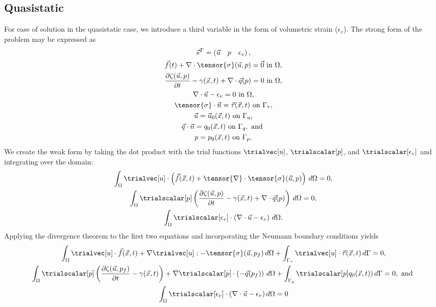 \subsection{Quasistatic}

For ease of solution in the quasistatic case, we introduce a third
variable in the form of volumetric strain ($\epsilon_v$).  The
strong form of the problem may be expressed as
\begin{gather}
\vec{s}^{T} = \left(\vec{u} \quad p \quad \epsilon_v\right), \\
\vec{f}(t) + \nabla \cdot \tensor{\sigma}(\vec{u},p) = \vec{0} \text{ in } \Omega, \\
\frac{\partial \zeta(\vec{u},p)}{\partial t} - \gamma(\vec{x},t) + \nabla \cdot \vec{q}(p) = 0 \text{ in } \Omega, \\
\nabla \cdot \vec{u} - \epsilon_{v} = 0 \text{ in } \Omega, \\
\tensor{\sigma} \cdot \vec{n} = \vec{\tau}(\vec{x},t) \text{ on } \Gamma_{\tau}, \\
\vec{u} = \vec{u}_0(\vec{x}, t) \text{ on } \Gamma_{u}, \\
\vec{q} \cdot \vec{n} = q_0(\vec{x}, t) \text{ on } \Gamma_{q}, \text{ and } \\
p = p_0(\vec{x},t) \text{ on } \Gamma_{p}.
\end{gather}
%
We create the weak form by taking the dot product with the trial
functions $\trialvec[u]$, $\trialscalar[p]$, and
$\trialscalar[\epsilon_{v}]$ and
integrating over the domain:
\begin{gather}
\int_\Omega \trialvec[u] \cdot \left( \vec{f}(\vec{x},t) + \tensor{\nabla} \cdot \tensor{\sigma} (\vec{u},p) \right) \, d\Omega = 0, \\
\int_\Omega  \trialscalar[p] \left( \frac{\partial \zeta(\vec{u},p)}{\partial t} - \gamma(\vec{x},t) + \nabla \cdot \vec{q}(p)\right) \, d\Omega = 0,\\
\int_{\Omega} \trialscalar[\epsilon_{v}]\cdot \left( \nabla \cdot \vec{u} - \epsilon_v \right) \, d\Omega.
\end{gather}
%
Applying the divergence theorem to the first two equations and
incorporating the Neumann boundary conditions yields
\begin{gather}
\int_\Omega \trialvec[u] \cdot \vec{f}(\vec{x},t) + \nabla \trialvec[u] : -\tensor{\sigma}(\vec{u},p_f) \,
d\Omega + \int_{\Gamma_\tau} \trialvec[u] \cdot \vec{\tau}(\vec{x},t) \, d\Gamma = 0, \\
\int_\Omega  \trialscalar[p] \left( \frac{\partial \zeta(\vec{u},p_f)}{\partial t} - \gamma(\vec{x},t)\right)
+ \nabla \trialscalar[p] \cdot \left(-\vec{q}(p_f)\right) \, d\Omega + \int_{\Gamma_q} \trialscalar[p] q_0(\vec{x},t))\, d\Gamma = 0, \text{ and } \\
\int_{\Omega} \trialscalar[\epsilon_{v}] \cdot \left(\nabla \cdot \vec{u} - \epsilon_{v} \right) d\Omega = 0
\end{gather}

